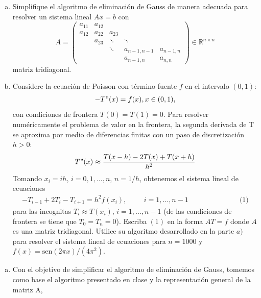 \begin{homeworkProblem}
  \begin{enumerate}[a)]
    \item Simplifique el algoritmo de eliminación de Gauss de manera adecuada para resolver un sistema lineal $Ax=b$ con
    \[
      A = \begin{pmatrix}
        a_{11} & a_{12} &  &  &  \\
        a_{12} & a_{22} & a_{23} &  &  \\
        & a_{23} & \ddots & \ddots &  \\
        &  & \ddots & a_{n-1,n-1} & a_{n-1,n} \\
        &  &  & a_{n-1,n} & a_{n,n}
      \end{pmatrix}\in \mathbb{R}^{n \times n}
    \]
    matriz tridiagonal.
    \item Considere la ecuación de Poisson con término fuente $f$ en el intervalo $(0,1)$:
    \begin{align*}
      -T"(x)=f(x), x \in (0,1),
    \end{align*}
    con condiciones de frontera $T(0)=T(1)=0$. Para resolver numéricamente el problema de valor en la frontera, la segunda derivada de T se aproxima por medio de diferencias finitas con un paso de discretización $h>0$:
    \begin{align*}
      T"(x)\approx \frac{T(x-h)-2T(x)+T(x+h)}{h^2}
    \end{align*}
    Tomando $x_i=ih$, $i=0, 1, \dotsc, n$, $n=1/h$, obtenemos el sistema lineal de ecuaciones
    \begin{align*}
      -T_{i-1}+2T_i-T_{i+1}=h^2f(x_i), \hspace{1cm} i=1, \dotsc, n-1   \hspace{3cm} \text{(1)}
    \end{align*}
    para las incognitas $T_i\approx T(x_i)$, $i=1, \dotsc, n-1$ (de las condiciones de frontera se tiene que $T_0=T_n=0$).
    Escriba $(1)$ en la forma $AT=f$ donde $A$ es una matriz tridiagonal. Utilice su algoritmo desarrollado en la parte $a)$ para resolver el sistema lineal de ecuaciones para $n=1000$ y $f(x)=\text{sen}(2\pi x)/(4\pi^2)$.
  \end{enumerate}
  \begin{solucion}
    \begin{enumerate}[a)]
      \item Con el objetivo de simplificar el algoritmo de eliminación de Gauss, tomemos como base el algoritmo presentado en clase y la representación general de la matriz A,\\

\end{enumerate}
\end{solucion}
\end{homeworkProblem}
